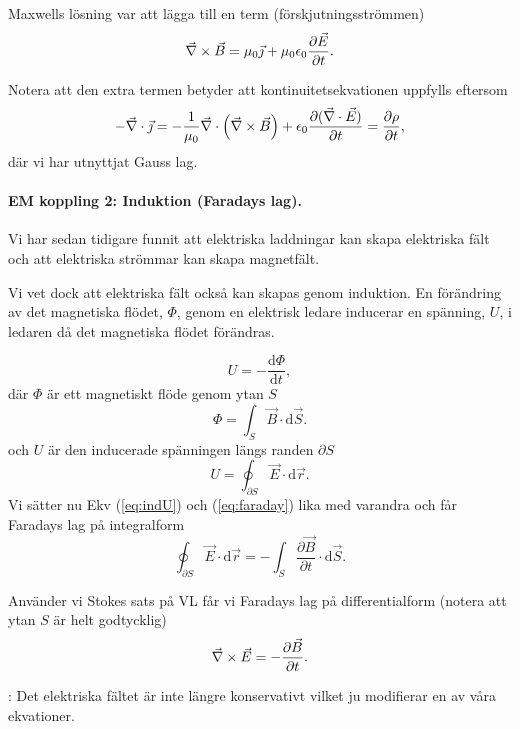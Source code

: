 \documentclass[%
oneside,                 %
final,                   %
10pt]{article}
\newcommand{\shortinlinecomment}[3]{{\color{red}{\bf #1}: #2}}
\begin{document}
Maxwells lösning var att lägga till en term (förskjutningsströmmen)
\begin{equation}
  \vec{\nabla} \times \vec{B} = \mu_0 \vec{\jmath} + \mu_0 \epsilon_0 \frac{\partial \vec{E}}{\partial t}.
\end{equation}

Notera att den extra termen betyder att kontinuitetsekvationen uppfylls eftersom
\[
-\vec{\nabla} \cdot \vec{\jmath} = -\frac{1}{\mu_0} \vec{\nabla} \cdot \left(\vec{\nabla} \times
\vec{B}\right) + \epsilon_0 \frac{\partial (\vec{\nabla} \cdot \vec{E})}{\partial t}
= \frac{\partial \rho}{\partial t},
\]
där vi har utnyttjat Gauss lag.

\paragraph{EM koppling 2: Induktion (Faradays lag).}
Vi har sedan tidigare funnit att elektriska laddningar kan skapa elektriska fält  och att elektriska strömmar kan skapa magnetfält.

Vi vet dock att elektriska fält också kan skapas genom induktion.  En förändring av det magnetiska flödet, $\Phi$, genom en elektrisk ledare inducerar en spänning, $U$, i ledaren då det magnetiska flödet förändras.

\begin{equation}
  U = - \frac{\mbox{d}\Phi}{\mbox{d}t},
  \label{eq:faraday}
\end{equation}
där $\Phi$ är ett magnetiskt flöde genom ytan $S$
\begin{equation}
  \Phi = \int_S \vec{B} \cdot \mbox{d} \vec{S}.
\end{equation}
och $U$ är den inducerade spänningen längs randen $\partial S$
\begin{equation}
  U = \oint_{\partial S} \vec{E} \cdot \mbox{d}\vec{r}.
  \label{eq:indU}
\end{equation}
Vi sätter nu Ekv (\ref{eq:indU}) och (\ref{eq:faraday}) lika med varandra och får Faradays lag på integralform
$$
  \oint_{\partial S} \vec{E} \cdot \mbox{d}\vec{r} = -
\int_S \frac{\partial \vec{B}}{\partial t} \cdot \mbox{d}\vec{S}.
$$

Använder vi Stokes sats på VL får vi Faradays lag på differentialform (notera att ytan $S$ är helt godtycklig)
\begin{equation}
  \vec{\nabla} \times \vec{E} = - \frac{\partial \vec{B}}{\partial t}.
\end{equation}

\shortinlinecomment{Kommentar 3}{ Det elektriska fältet är inte längre konservativt vilket ju modifierar en av våra ekvationer. }{ Det elektriska fältet är }
\end{document}
